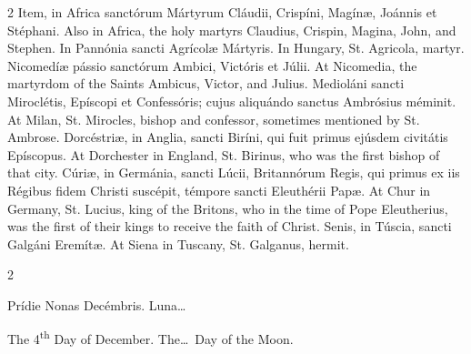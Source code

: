 \begin{paracol}{2}
Item, in Africa 
 sanctórum Mártyrum Cláudii, Crispíni, Magínæ, Joánnis et Stéphani.
\switchcolumn
{}
Also in Africa, the holy martyrs 
 Claudius, Crispin, Magina, John, and Stephen.
\switchcolumn*
{}
In Pannónia sancti 
 Agrícolæ Mártyris.
\switchcolumn
{}
In Hungary, St. Agricola, martyr.
\switchcolumn*
{}
Nicomedíæ pássio 
 sanctórum Ambici, Victóris et Júlii.
\switchcolumn
{}
At Nicomedia, the martyrdom of the 
 Saints Ambicus, Victor, and Julius.
\switchcolumn*
{}
Medioláni sancti 
 Miroclétis, Epíscopi et Confessóris; cujus aliquándo sanctus Ambrósius 
 méminit.
\switchcolumn
{}
At Milan, St. Mirocles, bishop and 
 confessor, sometimes mentioned by St. Ambrose.
\switchcolumn*
{}
Dorcéstriæ, in Anglia, 
 sancti Biríni, qui fuit primus ejúsdem civitátis Epíscopus.
\switchcolumn
{}
At Dorchester in England, St. 
 Birinus, who was the first bishop of that city.
\switchcolumn*
{}
Cúriæ, in Germánia, sancti Lúcii, Britannórum Regis, qui primus ex iis Régibus fidem Christi 
 suscépit, témpore sancti Eleuthérii Papæ.
\switchcolumn
{}
At Chur in Germany, St. Lucius, king 
 of the Britons, who in the time of Pope Eleutherius, was the first of their 
 kings to receive the faith of Christ.
\switchcolumn*
{}
Senis, in Túscia, 
 sancti Galgáni Eremítæ.
\switchcolumn
{}
At Siena in Tuscany, St. Galganus, 
 hermit.
\switchcolumn*
{}
\end{paracol}


\begin{paracol}{2}
\begin{center}{\color{gregoriocolor} Prídie Nonas Decémbris. 
 Luna\dots\ }\end{center}
\switchcolumn
{}
\begin{center}{\color{gregoriocolor} The 
 4\textsuperscript{th} Day of 
 December. The\dots\ Day of the Moon.}\end{center}
\end{paracol}

